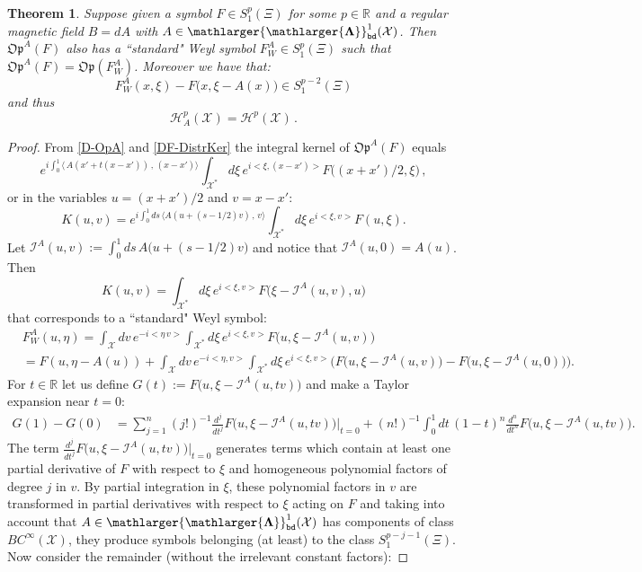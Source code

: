 \documentclass[12pt]{article}
\newtheorem{theorem}{Theorem}[section]
\theoremstyle{definition}
\def\R{\mathbb{R}}
\def\Op{\mathfrak{Op}}
\def\X{\mathcal X}
\def\beq{\begin{equation}}
\def\eeq{\end{equation}}
\def\Fb{\mathlarger{\mathlarger{\mathbf{\Lambda}}}_{\text{\tt bd}}}
\def\mI{\mathcal{I}}
\numberwithin{equation}{section}
\begin{document}
\begin{theorem}\label{L-Abounded}
	Suppose given a symbol $F\in{S}^p_1(\Xi)$ for some $p\in\R$ and a regular magnetic field $B=dA$ with $A\in\Fb^1(\X)$. Then $\Op^A(F)$ also has a ``standard" Weyl symbol $F^A_W\in{S}^p_1(\Xi)$ such that $\Op^A(F)=\Op(F^A_W)$. Moreover we have that:
	\begin{equation} \label{eq:2.2} F^A_W(x,\xi)-F\big (x,\xi-A(x)\big )\in {S}^{p-2}_1(\Xi)
	\end{equation}
	and thus 
	\beq \label{eq:2.3}  \mathscr{H}^p_A(\X)=\mathscr{H}^p(\X)\,.
	\eeq 
\end{theorem}
\begin{proof}
	From \eqref{D-OpA} and \eqref{DF-DistrKer} the integral kernel of  $\Op^A(F)$ equals 
	$$e^{i\int_0^1 \langle\,A(x'+t(x-x'))\,,\,(x-x')\rangle}\int_{\X^*} d\xi\,  e^{i<\xi,(x-x')>} F\big((x+x')/2,\xi\big) \,,$$
	or in the variables $u=(x+x')/2$ and $v=x-x'$:
	$$K(u,v)=e^{i\int_0^1 ds\, \langle{A} (u+(s-1/2)v)\,,\, v\rangle}\int_{\X^*} d\xi \,e^{i<\xi,v>} F(u,\xi). $$
	Let $\mI^A(u,v):=\int_0^1 ds\, A\big (u+(s-1/2)v\big )$ and notice that $\mI^A(u,0)=A(u)$. Then 
	$$K(u,v)=\int_{\X^*} d\xi\, e^{i<\xi,v>} F\big (\xi -\mI^A(u,v),u\big )$$
	that corresponds to a ``standard" Weyl symbol:
	\begin{align*}
		&F_W^A(u,\eta)=\int_\X dv\,  e^{-i<\eta\,v>} \int_{\X^*} d\xi \,  e^{i<\xi,v>} F\big (u,\xi -\mI^A(u,v)\big )\\
		&=F(u,\eta-A(u))+\int_\X dv\,  e^{-i<\eta,v>} \int_{\X^*} d\xi \,  e^{i<\xi,v>} \Big (F\big (u,\xi -\mI^A(u,v)\big ) -F\big (u,\xi-\mI^A(u,0)\big )\Big ).
	\end{align*}
	For $t\in \R$ let us define 
	$G(t):=F\big (u,\xi -\mI^A(u,tv)\big )$ and make a Taylor expansion  near $t=0$:
	\begin{align*}
		G(1)-G(0)&=\sum_{j=1}^n(j!)^{-1} \frac{d^j}{dt^j}F\big (u,\xi -\mI^A(u,tv)\big )|_{t=0}+(n!)^{-1}\int_0^1 dt\,(1-t)^n  \frac{d^n}{dt^n}F\big (u,\xi -\mI^A(u,tv)\big ).
	\end{align*}
	The term $\frac{d^j}{dt^j}F\big (u,\xi -\mI^A(u,tv)\big )|_{t=0}$ generates terms which contain at least one partial derivative of $F$ with respect to $\xi$ and homogeneous polynomial factors of degree  $j$ in $v$. By partial integration in $\xi$, these polynomial factors in $v$ are transformed in partial derivatives 
	with respect to $\xi$ acting on $F$ and taking into account that $A\in\Fb^1(\X)$ has components of class $BC^\infty(\X)$, they  produce symbols belonging (at least) to the class $S_1^{p-j-1}(\Xi)$. Now consider the remainder (without the irrelevant constant factors):

\end{proof}
\end{document}
